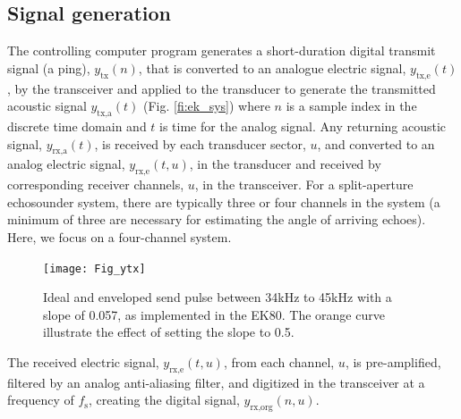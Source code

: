 \documentclass[preprint,12pt,TurnOnLineNumbers]{JASAnew}
\newcommand{\timesym}{t}
\newcommand{\samplesymt}{n}
\newcommand{\channelsym}{u}
\newcommand{\fs}{f_{\textrm{s}}}
\newcommand{\ytxe}{y_{\textrm{tx,e}}}
\newcommand{\ytxa}{y_{\textrm{tx,a}}}
\newcommand{\yrxa}{y_{\textrm{rx,a}}}
\newcommand{\yrxe}{y_{\textrm{rx,e}}}
\newcommand{\ytx}{y_{\textrm{tx}}}
\newcommand{\yrxorg}{y_{\textrm{rx,org}}}
\begin{document}
\subsection{Signal generation}

The controlling computer program generates a short-duration digital transmit signal (a ping), $\ytx(\samplesymt)$, that is converted to an analogue electric signal, $\ytxe(\timesym)$, by the transceiver and applied to the transducer to generate the transmitted acoustic signal $\ytxa(\timesym)$ (Fig. \ref{fi:ek_sys}) where $\samplesymt$ is a sample index in the discrete time domain and $\timesym$ is time for the analog signal. Any returning acoustic signal, $\yrxa(\timesym)$, is received by each transducer sector, $\channelsym$, and converted to an analog electric signal, $\yrxe(\timesym,\channelsym)$, in the transducer and received by corresponding receiver channels, $\channelsym$, in the transceiver. For a split-aperture echosounder system, there are typically three or four channels in the system (a minimum of three are necessary for estimating the angle of arriving echoes). Here, we focus on a four-channel system.

\begin{figure}
\texttt{[image: Fig\_ytx]}
\caption{\label{fi:ytx} Ideal and enveloped send pulse between 34kHz to 45kHz with a slope of 0.057, as implemented in the EK80. The orange curve illustrate the effect of setting the slope to 0.5.}
\end{figure}

The received electric signal, $\yrxe(\timesym,\channelsym)$, from each channel, $\channelsym$, is pre-amplified, filtered by an analog anti-aliasing filter, and digitized in the transceiver at a frequency of $\fs$, creating the digital signal, $\yrxorg(\samplesymt,\channelsym)$.
\end{document}
